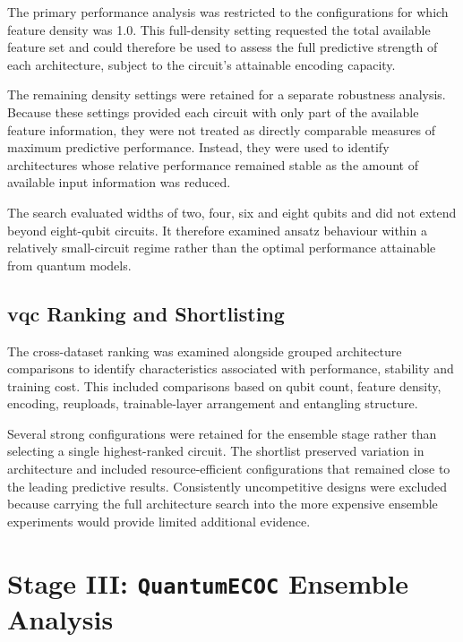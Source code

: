 \documentclass[]{UCD_CS_MSc_AAI_Report}
\begin{document}
The primary performance analysis was restricted to the configurations for which feature density was 1.0. This full-density setting requested the total available feature set and could therefore be used to assess the full predictive strength of each architecture, subject to the circuit's attainable encoding capacity.

The remaining density settings were retained for a separate robustness analysis. Because these settings provided each circuit with only part of the available feature information, they were not treated as directly comparable measures of maximum predictive performance. Instead, they were used to identify architectures whose relative performance remained stable as the amount of available input information was reduced.

The search evaluated widths of two, four, six and eight qubits and did not extend beyond eight-qubit circuits. It therefore examined ansatz behaviour within a relatively small-circuit regime rather than the optimal performance attainable from quantum models.

\subsection{\acs*{vqc} Ranking and Shortlisting}

The cross-dataset ranking was examined alongside grouped architecture comparisons to identify characteristics associated with performance, stability and training cost. This included comparisons based on qubit count, feature density, encoding, reuploads, trainable-layer arrangement and entangling structure.

Several strong configurations were retained for the ensemble stage rather than selecting a single highest-ranked circuit. The shortlist preserved variation in architecture and included resource-efficient configurations that remained close to the leading predictive results. Consistently uncompetitive designs were excluded because carrying the full architecture search into the more expensive ensemble experiments would provide limited additional evidence.

\section{Stage III: \texttt{QuantumECOC} Ensemble Analysis}
\label{sec:method-direct-ensemble}
\end{document}
